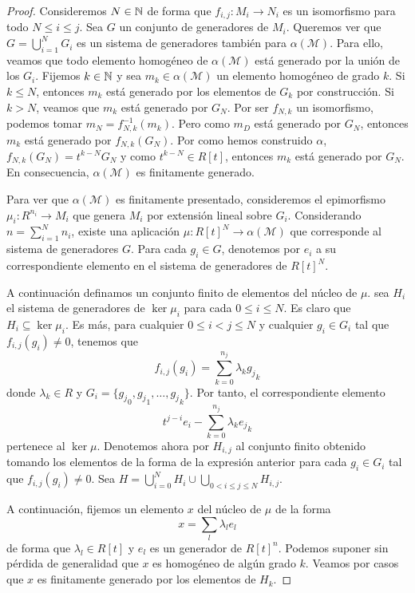 \begin{proof}
	Consideremos \(N \in \mathbb{N}\) de forma que \(f_{i,j} : M_i \to N_i\) es un isomorfismo para todo \(N \leq i \leq j\). Sea \(G\) un conjunto de generadores de \(M_i\). Queremos ver que \(G = \bigcup_{i=1}^N G_i\) es un sistema de generadores también para \(\alpha(\mathcal{M})\). Para ello, veamos que todo elemento homogéneo de \(\alpha(\mathcal{M})\) está generado por la unión de los \(G_i\). Fijemos \(k \in \mathbb{N}\) y sea \(m_k \in \alpha(\mathcal{M})\) un elemento homogéneo de grado \(k\). Si \(k \leq N\), entonces \(m_k\) está generado por los elementos de \(G_k\) por construcción. Si \(k > N\), veamos que \(m_k\) está generado por \(G_N\). Por ser \(f_{N,k}\) un isomorfismo, podemos tomar \(m_N = f^{-1}_{N,k}(m_k)\). Pero como \(m_D\) está generado por \(G_N\), entonces \(m_k\) está generado por \(f_{N,k}(G_N)\). Por como hemos construido \(\alpha\), \(f_{N,k}(G_N) = t^{k-N}G_N\) y como \(t^{k-N} \in R[t]\), entonces \(m_k\) está generado por \(G_N\). En consecuencia, \(\alpha(\mathcal{M})\) es finitamente generado.
	
	Para ver que \(\alpha(\mathcal{M})\) es finitamente presentado, consideremos el epimorfismo \(\mu_i : R^{n_i} \to M_i\) que genera \(M_i\) por extensión lineal sobre \(G_i\). Considerando \(n = \sum_{i=1}^N n_i\), existe una aplicación \(\mu : R[t]^N \to \alpha(\mathcal{M})\) que corresponde al sistema de generadores \(G\). Para cada \(g_i \in G\), denotemos por \(e_i\) a su correspondiente elemento en el sistema de generadores de \(R[t]^N\).
	
	A continuación definamos un conjunto finito de elementos del núcleo de \(\mu\). sea \(H_i\) el sistema de generadores de \(\ker \mu_i\) para cada \(0 \leq i \leq N\). Es claro que \(H_i \subseteq \ker \mu_i\). Es más, para cualquier \(0 \leq i < j \leq N\) y cualquier \(g_i \in G_i\) tal que \(f_{i,j}(g_i) \neq 0\), tenemos que 
	\[
		f_{i,j}(g_i) = \sum_{k=0}^{n_j} \lambda_k {g_j}_k
	\]
	donde \(\lambda_k \in R\) y \(G_i = \{ {g_j}_0, {g_j}_1, \ldots, {g_j}_k \}\). Por tanto, el correspondiente elemento 
	\[
		t^{j-i}e_i - \sum_{k=0}^{n_j} \lambda_k {e_j}_k
	\]
	pertenece al \(\ker \mu\). Denotemos ahora por \(H_{i,j}\) al conjunto finito obtenido tomando los elementos de la forma de la expresión anterior para cada \(g_i \in G_i\) tal que \(f_{i,j}(g_i) \neq 0\). Sea \(H = \bigcup_{i=0}^N H_i \cup \bigcup_{0 < i \leq j \leq N} H_{i,j}\).
	
	A continuación, fijemos un elemento \(x\) del núcleo de \(\mu\) de la forma
	\[
		x = \sum_l \lambda_l e_l
	\] de forma que \(\lambda_l \in R[t]\) y \(e_l\) es un generador de \(R[t]^n\). Podemos suponer sin pérdida de generalidad que \(x\) es homogéneo de algún grado \(k\). Veamos por casos que \(x\) es finitamente generado por los elementos de \(H_k\).
	

\end{proof}
